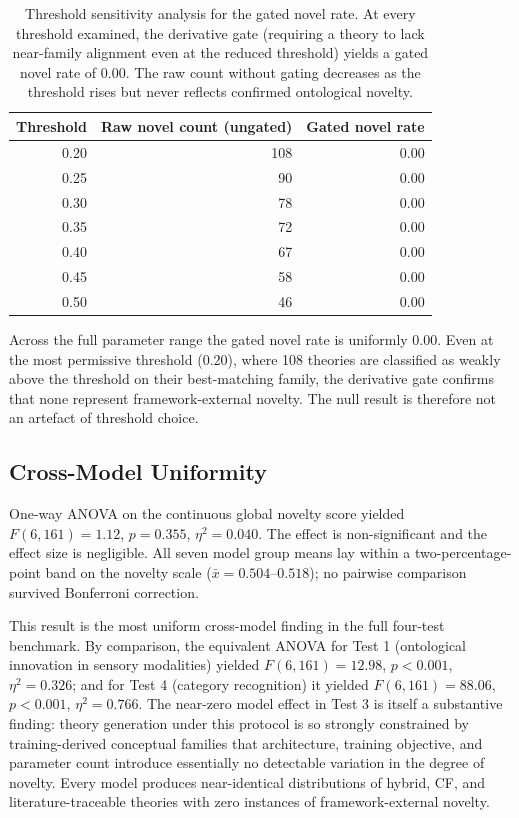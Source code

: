 \documentclass[pdflatex,sn-mathphys-num]{sn-jnl}
\begin{document}
\begin{table}[tp]
  \centering
  \caption{Threshold sensitivity analysis for the gated novel rate.
    At every threshold examined, the derivative gate (requiring a theory to
    lack near-family alignment even at the reduced threshold) yields a gated
    novel rate of 0.00.  The raw count without gating decreases as the
    threshold rises but never reflects confirmed ontological novelty.}
  \label{tab:sensitivity}
  \begin{tabular}{@{}rrr@{}}
    \toprule
    Threshold & Raw novel count (ungated) & Gated novel rate \\
    \midrule
    0.20 & 108 & 0.00 \\
    0.25 & 90  & 0.00 \\
    0.30 & 78  & 0.00 \\
    0.35 & 72  & 0.00 \\
    0.40 & 67  & 0.00 \\
    0.45 & 58  & 0.00 \\
    0.50 & 46  & 0.00 \\
    \bottomrule
  \end{tabular}
\end{table}

Across the full parameter range the gated novel rate is uniformly $0.00$.  Even
at the most permissive threshold ($0.20$), where 108 theories are classified as
weakly above the threshold on their best-matching family, the derivative gate
confirms that none represent framework-external novelty.  The null result is
therefore not an artefact of threshold choice.

\subsection{Cross-Model Uniformity}

One-way ANOVA on the continuous global novelty score yielded
$F(6,161)=1.12$, $p=0.355$, $\eta^{2}=0.040$.  The effect is
non-significant and the effect size is negligible.  All seven model group means
lay within a two-percentage-point band on the novelty scale
($\bar{x} = 0.504$--$0.518$); no pairwise comparison survived Bonferroni
correction.

This result is the most uniform cross-model finding in the full four-test
benchmark.  By comparison, the equivalent ANOVA for Test 1 (ontological
innovation in sensory modalities) yielded $F(6,161)=12.98$, $p<0.001$,
$\eta^2=0.326$; and for Test 4 (category recognition) it yielded
$F(6,161)=88.06$, $p<0.001$, $\eta^2=0.766$.  The near-zero model effect in
Test 3 is itself a substantive finding: theory generation under this protocol is
so strongly constrained by training-derived conceptual families that architecture,
training objective, and parameter count introduce essentially no detectable
variation in the degree of novelty.  Every model produces near-identical
distributions of hybrid, CF, and literature-traceable theories with zero
instances of framework-external novelty.
\end{document}

